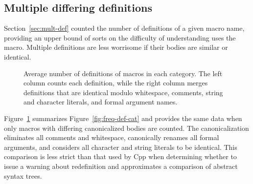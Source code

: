 \documentclass[10pt]{article}
\newcommand{\captionsmall}[1]{\caption[]{\small #1}}
\begin{document}
        
\subsection{Multiple differing definitions}

Section~\ref{sec:mult-def} counted the number of definitions of a given
macro name, providing an upper bound of sorts on the difficulty of
understanding uses the macro.  Multiple definitions are less worrisome if
their bodies are similar or identical.

        
%   

\begin{figure}
  {\small\centerline{}}
  
  \captionsmall{Average number of definitions of macros in each category.
    The left column counts each definition, while the right column merges
    definitions that are identical modulo whitespace, comments, string and
    character literals, and formal argument names.}
  \label{fig:freq-sum-cat}
\end{figure}


Figure~\ref{fig:freq-sum-cat} summarizes Figure~\ref{fig:freq-def-cat} and
provides the same data when only macros with differing canonicalized bodies
are counted.  The canonicalization eliminates all comments and whitespace,
canonically renames all formal arguments, and considers all character and
string literals to be identical.  This comparison is less strict than that
used by Cpp when determining whether to issue a warning about redefinition
and approximates a comparison of abstract syntax trees.
\end{document}
